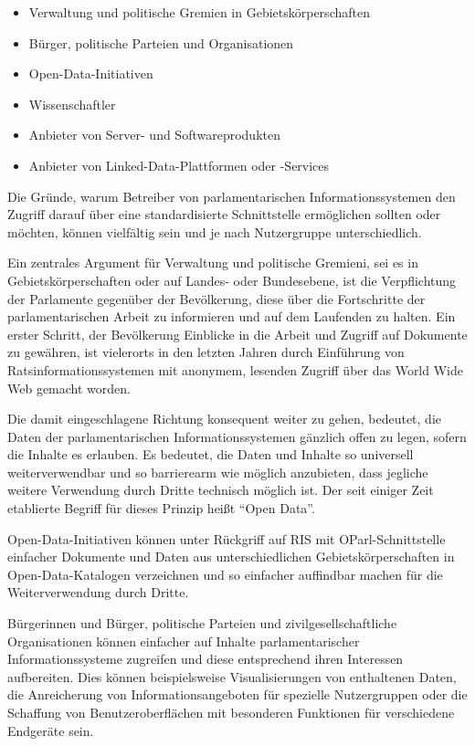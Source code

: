 \documentclass[,a4paper]{article}
\begin{document}
\begin{itemize}
\itemsep1pt\parskip0pt
\item
  Verwaltung und politische Gremien in Gebietskörperschaften
\item
  Bürger, politische Parteien und Organisationen
\item
  Open-Data-Initiativen
\item
  Wissenschaftler
\item
  Anbieter von Server- und Softwareprodukten
\item
  Anbieter von Linked-Data-Plattformen oder -Services
\end{itemize}

Die Gründe, warum Betreiber von parlamentarischen Informationssystemen
den Zugriff darauf über eine standardisierte Schnittstelle ermöglichen
sollten oder möchten, können vielfältig sein und je nach Nutzergruppe
unterschiedlich.

Ein zentrales Argument für Verwaltung und politische Gremieni, sei es in
Gebietskörperschaften oder auf Landes- oder Bundesebene, ist die
Verpflichtung der Parlamente gegenüber der Bevölkerung, diese über die
Fortschritte der parlamentarischen Arbeit zu informieren und auf dem
Laufenden zu halten. Ein erster Schritt, der Bevölkerung Einblicke in
die Arbeit und Zugriff auf Dokumente zu gewähren, ist vielerorts in den
letzten Jahren durch Einführung von Ratsinformationssystemen mit
anonymem, lesenden Zugriff über das World Wide Web gemacht worden.

Die damit eingeschlagene Richtung konsequent weiter zu gehen, bedeutet,
die Daten der parlamentarischen Informationssystemen gänzlich offen zu
legen, sofern die Inhalte es erlauben. Es bedeutet, die Daten und
Inhalte so universell weiterverwendbar und so barrierearm wie möglich
anzubieten, dass jegliche weitere Verwendung durch Dritte technisch
möglich ist. Der seit einiger Zeit etablierte Begriff für dieses Prinzip
heißt ``Open Data''.

Open-Data-Initiativen können unter Rückgriff auf RIS mit
OParl-Schnittstelle einfacher Dokumente und Daten aus unterschiedlichen
Gebietskörperschaften in Open-Data-Katalogen verzeichnen und so
einfacher auffindbar machen für die Weiterverwendung durch Dritte.

Bürgerinnen und Bürger, politische Parteien und zivilgesellschaftliche
Organisationen können einfacher auf Inhalte parlamentarischer
Informationssysteme zugreifen und diese entsprechend ihren Interessen
aufbereiten. Dies können beispielsweise Visualisierungen von enthaltenen
Daten, die Anreicherung von Informationsangeboten für spezielle
Nutzergruppen oder die Schaffung von Benutzeroberflächen mit besonderen
Funktionen für verschiedene Endgeräte sein.
\end{document}
